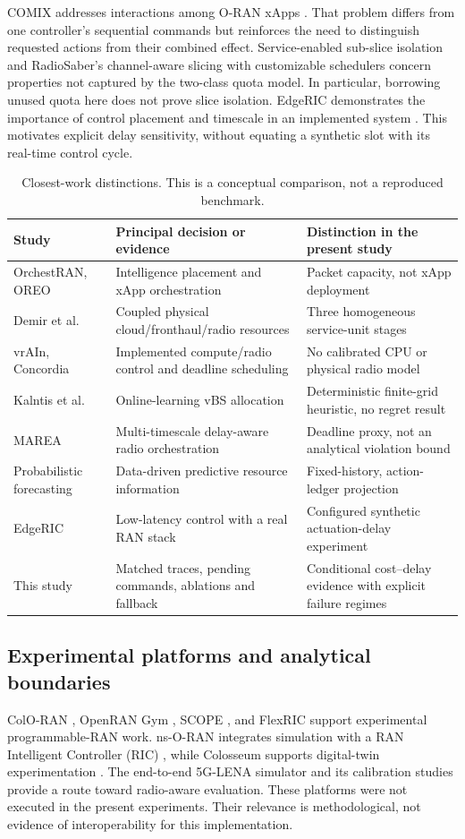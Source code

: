 \documentclass[10pt,a4paper]{article}
\begin{document}
COMIX addresses interactions among O-RAN xApps \cite{comix}. That problem differs
from one controller's sequential commands but reinforces the need to distinguish
requested actions from their combined effect. Service-enabled sub-slice isolation
\cite{5erasi} and RadioSaber's channel-aware slicing with customizable schedulers
\cite{radiosaber} concern properties not captured by the two-class quota model.
In particular, borrowing unused quota here does not prove slice isolation.
EdgeRIC demonstrates the importance of control placement and timescale in an
implemented system \cite{edgeric}. This motivates explicit delay sensitivity,
without equating a synthetic slot with its real-time control cycle.

\begin{table}[htbp]\centering\small
\caption{Closest-work distinctions. This is a conceptual comparison, not a reproduced benchmark.}
\begin{tabular}{p{29mm}p{53mm}p{66mm}}\toprule
Study & Principal decision or evidence & Distinction in the present study\\\midrule
OrchestRAN, OREO & Intelligence placement and xApp orchestration & Packet capacity, not xApp deployment\\
Demir et al. & Coupled physical cloud/fronthaul/radio resources & Three homogeneous service-unit stages\\
vrAIn, Concordia & Implemented compute/radio control and deadline scheduling & No calibrated CPU or physical radio model\\
Kalntis et al. & Online-learning vBS allocation & Deterministic finite-grid heuristic, no regret result\\
MAREA & Multi-timescale delay-aware radio orchestration & Deadline proxy, not an analytical violation bound\\
Probabilistic forecasting & Data-driven predictive resource information & Fixed-history, action-ledger projection\\
EdgeRIC & Low-latency control with a real RAN stack & Configured synthetic actuation-delay experiment\\
This study & Matched traces, pending commands, ablations and fallback & Conditional cost--delay evidence with explicit failure regimes\\\bottomrule
\end{tabular}\label{tab:related}
\end{table}

\subsection{Experimental platforms and analytical boundaries}
ColO-RAN \cite{coloran}, OpenRAN Gym \cite{gym}, SCOPE \cite{scope}, and FlexRIC
\cite{flexric} support experimental programmable-RAN work. ns-O-RAN integrates
simulation with a RAN Intelligent Controller (RIC) \cite{nsoran}, while Colosseum
supports digital-twin experimentation \cite{colosseum}. The end-to-end 5G-LENA
simulator \cite{lena} and its calibration studies \cite{calibration} provide a
route toward radio-aware evaluation. These platforms were not executed in the
present experiments. Their relevance is methodological, not evidence of
interoperability for this implementation.
\end{document}
